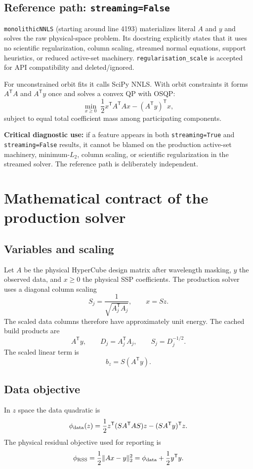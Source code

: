 \documentclass[10pt,a4paper]{article}
\newcommand{\code}[1]{\texttt{#1}}
\newenvironment{maintnote}{\begin{leftbar}\small\color{darkgray}}{\end{leftbar}}
\begin{document}
\subsection{Reference path: \code{streaming=False}}
\code{monolithicNNLS} (starting around line 4193) materializes literal $A$ and $y$ and solves the raw physical-space problem. Its docstring explicitly states that it uses no scientific regularization, column scaling, streamed normal equations, support heuristics, or reduced active-set machinery. \code{regularisation\_scale} is accepted for API compatibility and deleted/ignored.

For unconstrained orbit fits it calls SciPy NNLS. With orbit constraints it forms $A^{\mathsf T}A$ and $A^{\mathsf T}y$ once and solves a convex QP with OSQP:
\[
\min_{x\ge 0}\;\frac{1}{2}x^{\mathsf T}A^{\mathsf T}Ax-(A^{\mathsf T}y)^{\mathsf T}x,
\]
subject to equal total coefficient mass among participating components.

\begin{maintnote}
\textbf{Critical diagnostic use:} if a feature appears in both \code{streaming=True} and \code{streaming=False} results, it cannot be blamed on the production active-set machinery, minimum-$L_2$, column scaling, or scientific regularization in the streamed solver. The reference path is deliberately independent.
\end{maintnote}

\section{Mathematical contract of the production solver}
\subsection{Variables and scaling}
Let $A$ be the physical HyperCube design matrix after wavelength masking, $y$ the observed data, and $x\ge0$ the physical SSP coefficients. The production solver uses a diagonal column scaling
\[
S_j = \frac{1}{\sqrt{A_j^{\mathsf T}A_j}}, \qquad x = Sz.
\]
The scaled data columns therefore have approximately unit energy. The cached build products are
\[
A^{\mathsf T}y, \qquad D_j=A_j^{\mathsf T}A_j, \qquad S_j=D_j^{-1/2}.
\]
The scaled linear term is
\[
b_z = S(A^{\mathsf T}y).
\]

\subsection{Data objective}
In $z$ space the data quadratic is
\[
\phi_{\rm data}(z)=\frac{1}{2}z^{\mathsf T}(SA^{\mathsf T}AS)z-(SA^{\mathsf T}y)^{\mathsf T}z.
\]
The physical residual objective used for reporting is
\[
\phi_{\rm RSS}=\frac{1}{2}\lVert Ax-y\rVert_2^2=\phi_{\rm data}+\frac{1}{2}y^{\mathsf T}y.
\]
\end{document}
